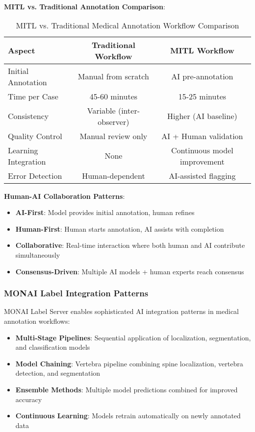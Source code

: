\textbf{MITL vs. Traditional Annotation Comparison}:

\begin{table}[htbp]
\centering
\caption{MITL vs. Traditional Medical Annotation Workflow Comparison}
\label{tab:mitl-comparison}
\begin{tabular}{|l|c|c|}
\hline
\textbf{Aspect} & \textbf{Traditional Workflow} & \textbf{MITL Workflow} \\
\hline
Initial Annotation & Manual from scratch & AI pre-annotation \\
Time per Case & 45-60 minutes & 15-25 minutes \\
Consistency & Variable (inter-observer) & Higher (AI baseline) \\
Quality Control & Manual review only & AI + Human validation \\
Learning Integration & None & Continuous model improvement \\
Error Detection & Human-dependent & AI-assisted flagging \\
\hline
\end{tabular}
\end{table}

\textbf{Human-AI Collaboration Patterns}:

\begin{itemize}
    \item \textbf{AI-First}: Model provides initial annotation, human refines
    \item \textbf{Human-First}: Human starts annotation, AI assists with completion
    \item \textbf{Collaborative}: Real-time interaction where both human and AI contribute simultaneously
    \item \textbf{Consensus-Driven}: Multiple AI models + human experts reach consensus
\end{itemize}

\subsubsection{MONAI Label Integration Patterns}

MONAI Label Server enables sophisticated AI integration patterns in medical annotation workflows:

\begin{itemize}
    \item \textbf{Multi-Stage Pipelines}: Sequential application of localization, segmentation, and classification models
    \item \textbf{Model Chaining}: Vertebra pipeline combining spine localization, vertebra detection, and segmentation
    \item \textbf{Ensemble Methods}: Multiple model predictions combined for improved accuracy
    \item \textbf{Continuous Learning}: Models retrain automatically on newly annotated data
\end{itemize}

